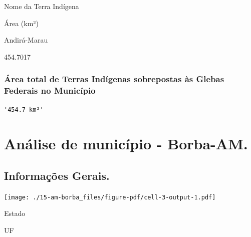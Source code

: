 \documentclass[
  letterpaper,
]{report}
\begin{document}
\n    

\n      

Nome da Terra Indígena

\n      

Área (km²)

\n    

\n  

\n  

\n    

\n      

Andirá-Marau

\n      

454.7017

\n    

\n  

\n

\hypertarget{uxe1rea-total-de-terras-induxedgenas-sobrepostas-uxe0s-glebas-federais-no-municuxedpio}{%
\subsection{Área total de Terras Indígenas sobrepostas às Glebas
Federais no
Município}\label{uxe1rea-total-de-terras-induxedgenas-sobrepostas-uxe0s-glebas-federais-no-municuxedpio}}

\begin{verbatim}
'454.7 km²'
\end{verbatim}


\hypertarget{anuxe1lise-de-municuxedpio---borba-am.}{%
\chapter{Análise de município -
Borba-AM.}\label{anuxe1lise-de-municuxedpio---borba-am.}}

\hypertarget{informauxe7uxf5es-gerais.-2}{%
\section{Informações Gerais.}\label{informauxe7uxf5es-gerais.-2}}

\texttt{[image: ./15-am-borba\_files/figure-pdf/cell-3-output-1.pdf]}

\n  

\n    

\n      

Estado

\n      

UF

\n      
\end{document}
